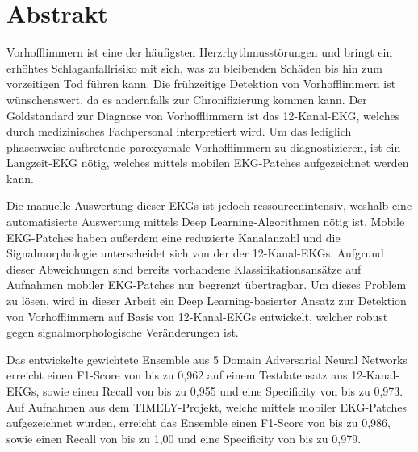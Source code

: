 \chapter*{Abstrakt}

Vorhofflimmern ist eine der häufigsten Herzrhythmusstörungen und bringt ein erhöhtes Schlaganfallrisiko mit sich, was zu bleibenden Schäden bis hin zum vorzeitigen Tod führen kann. Die frühzeitige Detektion von Vorhofflimmern ist wünschenswert, da es andernfalls zur Chronifizierung kommen kann.
Der Goldstandard zur Diagnose von Vorhofflimmern ist das 12-Kanal-EKG, welches durch medizinisches Fachpersonal interpretiert wird. Um das lediglich phasenweise auftretende paroxysmale Vorhofflimmern zu diagnostizieren, ist ein Langzeit-EKG nötig, welches mittels mobilen EKG-Patches aufgezeichnet werden kann. 

Die manuelle Auswertung dieser EKGs ist jedoch ressourcenintensiv, weshalb eine automatisierte Auswertung mittels Deep Learning-Algorithmen nötig ist. Mobile EKG-Patches haben außerdem eine reduzierte Kanalanzahl und die Signalmorphologie unterscheidet sich von der der 12-Kanal-EKGs. Aufgrund dieser Abweichungen sind bereits vorhandene Klassifikationsansätze auf Aufnahmen mobiler EKG-Patches nur begrenzt übertragbar. 
Um dieses Problem zu lösen, wird in dieser Arbeit ein Deep Learning-basierter Ansatz zur Detektion von Vorhofflimmern auf Basis von 12-Kanal-EKGs entwickelt, welcher robust gegen signalmorphologische Veränderungen ist. 

Das entwickelte gewichtete Ensemble aus 5 Domain Adversarial Neural Networks erreicht einen F1-Score von bis zu 0,962 auf einem Testdatensatz aus 12-Kanal-EKGs, sowie einen Recall von bis zu 0,955 und eine Specificity von bis zu 0,973.
Auf Aufnahmen aus dem TIMELY-Projekt, welche mittels mobiler EKG-Patches aufgezeichnet wurden, erreicht das Ensemble einen F1-Score von bis zu 0,986, sowie einen Recall von bis zu 1,00 und eine Specificity von bis zu 0,979.
